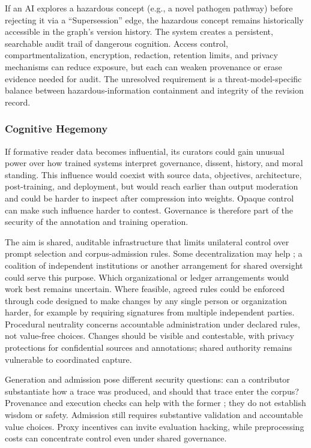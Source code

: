 \documentclass[11pt]{article}
\begin{document}
If an AI explores a hazardous concept (e.g., a novel pathogen pathway) before rejecting it via a ``Supersession'' edge, the hazardous concept remains historically accessible in the graph's version history. The system creates a persistent, searchable audit trail of dangerous cognition. Access control, compartmentalization, encryption, redaction, retention limits, and privacy mechanisms can reduce exposure, but each can weaken provenance or erase evidence needed for audit. The unresolved requirement is a threat-model-specific balance between hazardous-information containment and integrity of the revision record.

\subsubsection{Cognitive Hegemony}

If formative reader data becomes influential, its curators could gain unusual
power over how trained systems interpret governance, dissent, history, and
moral standing. This influence would coexist with source data, objectives,
architecture, post-training, and deployment, but would reach earlier than
output moderation and could be harder to inspect after compression into
weights. Opaque control can make such influence harder to contest. Governance
is therefore part of the security of the annotation and training operation.

The aim is shared, auditable infrastructure that limits unilateral control over
prompt selection and corpus-admission rules. Some decentralization may help
\cite{westerberg2025superintelligence}; a coalition of independent institutions
or another arrangement for shared oversight could
serve this purpose. Which organizational or ledger arrangements would work best
remains uncertain. Where feasible, agreed rules could be enforced through code
designed to make changes by any single person or organization harder, for
example by requiring signatures from multiple independent parties. Procedural
neutrality concerns accountable administration under
declared rules, not value-free choices. Changes should be visible and
contestable, with privacy protections for confidential sources and annotations;
shared authority remains vulnerable to coordinated capture.

Generation and admission pose different security questions: can a contributor
substantiate how a trace was produced, and should that trace enter the corpus?
Provenance and execution checks can help with the former
\cite{arutyunyan2023decentralized, harris2019decentralized}; they do not establish
wisdom or safety. Admission still requires substantive validation and
accountable value choices. Proxy incentives can invite evaluation hacking,
while preprocessing costs can concentrate control even under shared governance.
\end{document}
